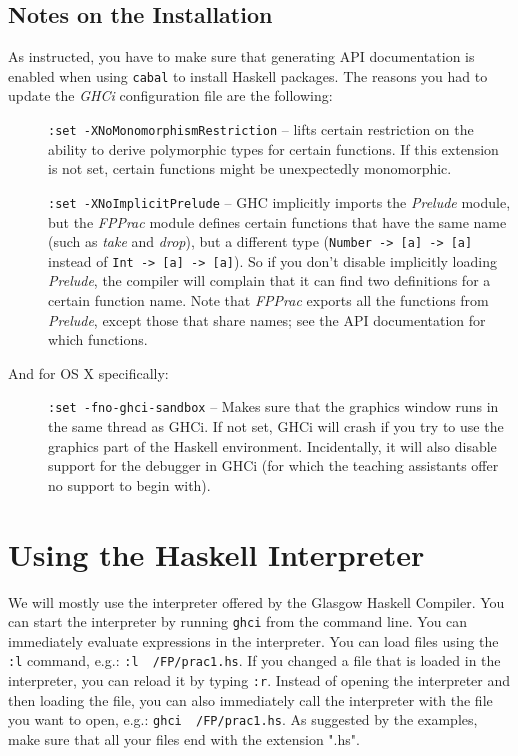 \documentclass[]{article}
\begin{document}
\subsection{Notes on the Installation}
As instructed, you have to make sure that generating API documentation is enabled when using \texttt{cabal} to install Haskell packages.
The reasons you had to update the \emph{GHCi} configuration file are the following:
\begin{description}
  \item[] \texttt{:set -XNoMonomorphismRestriction} -- lifts certain restriction on the ability to derive polymorphic types for certain functions.
  If this extension is not set, certain functions might be unexpectedly monomorphic.
  \item[] \texttt{:set -XNoImplicitPrelude} -- GHC implicitly imports the \emph{Prelude} module, but the \emph{FPPrac} module defines certain functions that have the same name (such as \emph{take} and \emph{drop}), but a different type (\texttt{Number -> [a] -> [a]} instead of \texttt{Int -> [a] -> [a]}).
  So if you don't disable implicitly loading \emph{Prelude}, the compiler will complain that it can find two definitions for a certain function name.
  Note that \emph{FPPrac} exports all the functions from \emph{Prelude}, except those that share names; see the API documentation for which functions.
\end{description}
And for OS X specifically:
\begin{description}
  \item[] \texttt{:set -fno-ghci-sandbox} -- Makes sure that the graphics window runs in the same thread as GHCi.
  If not set, GHCi will crash if you try to use the graphics part of the Haskell environment.
  Incidentally, it will also disable support for the debugger in GHCi (for which the teaching assistants offer no support to begin with).
\end{description}

\section{Using the Haskell Interpreter}
We will mostly use the interpreter offered by the Glasgow Haskell Compiler. You can start the interpreter by running \texttt{ghci} from the command line.
You can immediately evaluate expressions in the interpreter. You can load files using the \texttt{:l} command, e.g.: \texttt{:l ~/FP/prac1.hs}.
If you changed a file that is loaded in the interpreter, you can reload it by typing \texttt{:r}.
Instead of opening the interpreter and then loading the file, you can also immediately call the interpreter with the file you want to open, e.g.: \texttt{ghci ~/FP/prac1.hs}.
As suggested by the examples, make sure that all your files end with the extension ".hs".
\end{document}
